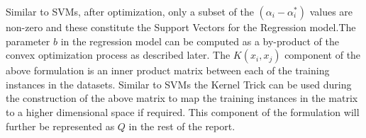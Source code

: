 \documentclass[12pt]{article}
\begin{document}
 Similar to SVMs, after optimization, only a subset of the $(\alpha_{i} - \alpha^*_{i})$ values are non-zero and these constitute the Support Vectors for the Regression model.The parameter $b$ in the regression model can be computed as a by-product of the convex optimization process as described later.
 \newline
 \newline
 The $K(x_{i}, x_{j})$ component of the above formulation is an inner product matrix between each of the training instances in the datasets\footnotemark. Similar to SVMs the Kernel Trick can be used during the construction of the above matrix to map the training instances in the matrix to a higher dimensional space if required. This component of the formulation will further be represented as $Q$ in the rest of the report.
\end{document}
